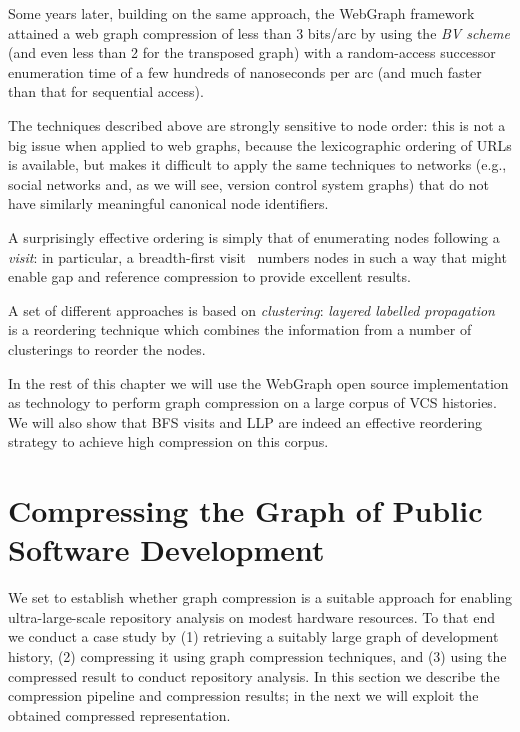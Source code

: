 Some years later, building on the same approach, the WebGraph
framework~\cite{BoVWFI} attained a web graph compression of less than 3
bits/arc by using the \emph{BV scheme} (and even less than 2 for the transposed
graph) with a random-access successor enumeration time of a few hundreds of
nanoseconds per arc (and much faster than that for sequential access).

The techniques described above are strongly sensitive to node order: this is
not a big issue when applied to web graphs, because the lexicographic ordering
of URLs is available, but makes it difficult to apply the same techniques to
networks (e.g., social networks and, as we will see, version control system
graphs) that do not have similarly meaningful canonical node identifiers.

A surprisingly effective ordering is simply that of enumerating nodes following
a \emph{visit}: in particular, a breadth-first visit~\cite{ApDGCB} numbers
nodes in such a way that might enable gap and reference compression to provide
excellent results.

A set of different approaches is based on \emph{clustering}: \emph{layered
  labelled propagation}~\cite{BRSLLP} is a reordering technique which combines
the information from a number of clusterings to reorder the nodes.

In the rest of this chapter we will use the WebGraph open source implementation
as technology to perform graph compression on a large corpus of VCS histories.
We will also show that \gls{BFS} visits and \gls{LLP} are indeed an effective
reordering strategy to achieve high compression on this corpus.

\section{Compressing the Graph of Public Software Development}%
\label{sec:compression-comp}

We set to establish whether graph compression is a suitable approach for
enabling ultra-large-scale repository analysis on modest hardware resources.
To that end we conduct a case study by (1) retrieving a suitably large
graph of development history, (2) compressing it using graph compression
techniques, and (3) using the compressed result to conduct repository analysis.
In this section we describe the compression pipeline and compression results;
in the next we will exploit the obtained compressed representation.

